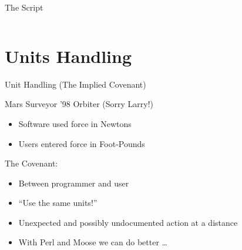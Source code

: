\documentclass[mathserif]{beamer}
\begin{document}
\begin{frame}{The Script}
  \begin{columns}
    \begin{column}{0.49\linewidth}
      \begin{block}{}
        \scriptsize
        
      \end{block}
    \end{column}
    \begin{column}{0.49\linewidth}
      \begin{block}{}
        \scriptsize
        
      \end{block}
      \vspace{4mm}
      \centering
    \end{column}
  \end{columns}
\end{frame}

\section{Units Handling}

\begin{frame}{Unit Handling (The Implied Covenant)}
  \begin{block}{Mars Surveyor '98 Orbiter (Sorry Larry!)}
    \begin{itemize}
      \item Software used force in Newtons
      \item Users entered force in Foot-Pounds
    \end{itemize}
  \end{block}
  \vfill
  The Covenant:
  \begin{itemize}
    \item<2-> Between programmer and user
    \item<3-> ``Use the same units!''
    \item<4-> Unexpected and possibly undocumented action at a distance
    \item<5-> With Perl and Moose we can do better \ldots
  \end{itemize}
\end{frame}
\end{document}
